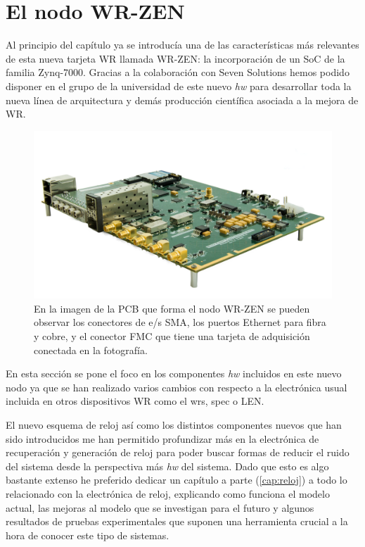 \section{El nodo WR-ZEN}

Al principio del capítulo ya se introducía una de las características más 
relevantes de esta nueva tarjeta WR llamada WR-ZEN: la incorporación de un SoC 
de la familia Zynq-7000. Gracias a la colaboración con Seven Solutions hemos 
podido disponer en el grupo de la universidad de este nuevo \textit{hw} para 
desarrollar toda la nueva línea de arquitectura y demás producción científica 
asociada a la mejora de WR.

\begin{figure}
	\centering
	\includegraphics[width=0.7\linewidth]{imagenes/wrzen}
	\caption[Foto de la tarjeta WR-ZEN]{En la imagen de la PCB que forma el 
	nodo WR-ZEN se pueden observar los conectores de e/s SMA, los puertos 
	Ethernet para fibra y cobre, y el conector FMC que tiene una tarjeta de 
	adquisición conectada en la fotografía.}
	\label{fig:wrzen}
\end{figure}

En esta sección se pone el foco en los componentes \textit{hw} incluidos en 
este nuevo nodo ya que se han realizado varios cambios con respecto a la 
electrónica usual incluida en otros dispositivos WR como el \gls{wrs}, 
\gls{spec} o LEN.


El nuevo esquema de reloj así como los distintos componentes nuevos que han 
sido introducidos me han permitido profundizar más en la electrónica de 
recuperación y generación de reloj para poder buscar formas de reducir el ruido 
del sistema desde la perspectiva más \textit{hw} del sistema. Dado que esto es 
algo bastante extenso he preferido dedicar un capítulo a parte 
(\ref{cap:reloj}) a todo lo relacionado 
con la electrónica de reloj, explicando como funciona el modelo actual, las 
mejoras al modelo que se investigan para el futuro y algunos resultados de 
pruebas experimentales que suponen una herramienta crucial a la hora de conocer 
este tipo de sistemas.

